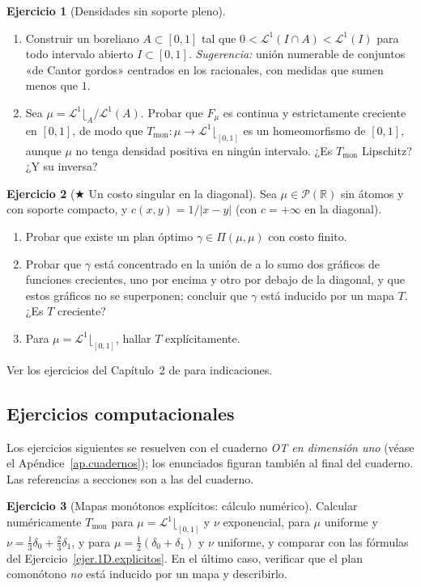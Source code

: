 \documentclass[12pt, a4paper]{amsbook}
\newcommand{\R}{{\mathbb R}}
\newcommand{\LL}{{\mathcal L}}
\theoremstyle{remark}
\theoremstyle{definition}
\newtheorem{ejercicio}{Ejercicio}[chapter]
\numberwithin{section}{chapter}
\numberwithin{subsection}{section}
\numberwithin{equation}{section}
\numberwithin{figure}{chapter}
\begin{document}
\begin{ejercicio}[Densidades sin soporte pleno]\label{ejer.1D.boreliano}
\leavevmode
\begin{enumerate}[label=(\alph*)]
\item Construir un boreliano $A\subset[0,1]$ tal que
$0<\LL^1(I\cap A)<\LL^1(I)$ para todo intervalo abierto $I\subset[0,1]$.
\emph{Sugerencia:} unión numerable de conjuntos «de Cantor gordos»
centrados en los racionales, con medidas que sumen menos que $1$.
\item Sea $\mu=\LL^1\lfloor_A/\LL^1(A)$. Probar que $F_\mu$ es continua y
estrictamente creciente en $[0,1]$, de modo que $T_\text{mon}\colon\mu\to\LL^1\lfloor_{[0,1]}$
es un homeomorfismo de $[0,1]$, aunque $\mu$ no tenga densidad positiva en
ningún intervalo. ¿Es $T_\text{mon}$ Lipschitz? ¿Y su inversa?
\end{enumerate}
\end{ejercicio}

\begin{ejercicio}[$\bigstar$ Un costo singular en la diagonal]\label{ejer.1D.singular}
Sea $\mu\in\mathcal P(\R)$ sin átomos y con soporte compacto, y
$c(x,y)=1/|x-y|$ (con $c=+\infty$ en la diagonal).
\begin{enumerate}[label=(\alph*)]
\item Probar que existe un plan óptimo $\gamma\in\Pi(\mu,\mu)$ con costo
finito.
\item Probar que $\gamma$ está concentrado en la unión de a lo sumo dos
gráficos de funciones crecientes, uno por encima y otro por debajo de la
diagonal, y que estos gráficos no se superponen; concluir que $\gamma$ está
inducido por un mapa $T$. ¿Es $T$ creciente?
\item Para $\mu=\LL^1\lfloor_{[0,1]}$, hallar $T$ explícitamente.
\end{enumerate}
Ver los ejercicios del Capítulo~2 de \cite{Santambrogio} para indicaciones.
\end{ejercicio}

\subsection*{Ejercicios computacionales}

Los ejercicios siguientes se resuelven con el cuaderno \emph{OT en dimensión
uno} (véase el Apéndice~\ref{ap.cuadernos}); los enunciados figuran también al
final del cuaderno. Las referencias a secciones son a las del cuaderno.

\begin{ejercicio}[Mapas monótonos explícitos: cálculo numérico]\label{ejc.1D.explicitos}
Calcular numéricamente $T_{\mathrm{mon}}$ para $\mu=\LL^1\lfloor_{[0,1]}$ y
$\nu$ exponencial, para $\mu$ uniforme y $\nu=\frac13\delta_0+\frac23\delta_1$,
y para $\mu=\frac12(\delta_0+\delta_1)$ y $\nu$ uniforme, y comparar con las
fórmulas del Ejercicio~\ref{ejer.1D.explicitos}. En el último caso, verificar
que el plan comonótono \emph{no} está inducido por un mapa y describirlo.
\end{ejercicio}
\end{document}
